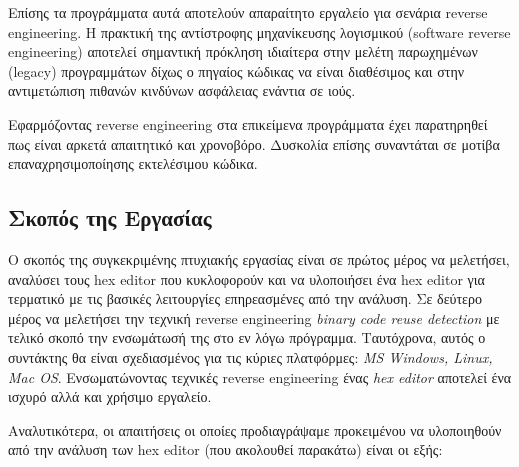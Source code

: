 Επίσης τα προγράμματα αυτά αποτελούν απαραίτητο εργαλείο για σενάρια reverse engineering. 
Η πρακτική της αντίστροφης μηχανίκευσης λογισμικού (software reverse engineering) αποτελεί σημαντική πρόκληση ιδιαίτερα στην μελέτη παρωχημένων (legacy) προγραμμάτων δίχως ο πηγαίος κώδικας να είναι διαθέσιμος και στην αντιμετώπιση πιθανών κινδύνων ασφάλειας ενάντια σε ιούς.

Εφαρμόζοντας reverse engineering στα επικείμενα προγράμματα έχει παρατηρηθεί πως είναι αρκετά απαιτητικό και χρονοβόρο. Δυσκολία επίσης συναντάται σε μοτίβα επαναχρησιμοποίησης εκτελέσιμου κώδικα.

\pagebreak
\subsection{Σκοπός της Εργασίας}
Ο σκοπός της συγκεκριμένης πτυχιακής εργασίας είναι σε πρώτος μέρος να μελετήσει, αναλύσει τους hex editor που κυκλοφορούν και να υλοποιήσει ένα hex editor για τερματικό με τις βασικές λειτουργίες επηρεασμένες από την ανάλυση.
Σε δεύτερο μέρος να μελετήσει την τεχνική reverse engineering \emph{binary code reuse detection} με τελικό σκοπό την ενσωμάτωσή της στο εν λόγω πρόγραμμα.
Ταυτόχρονα, αυτός ο συντάκτης θα είναι σχεδιασμένος για τις κύριες πλατφόρμες: \emph{MS Windows, Linux, Mac OS}.
Ενσωματώνοντας τεχνικές reverse engineering ένας \emph{hex editor} αποτελεί ένα ισχυρό αλλά και χρήσιμο εργαλείο.

Αναλυτικότερα, οι απαιτήσεις οι οποίες προδιαγράψαμε προκειμένου να υλοποιηθούν από την ανάλυση των hex editor (που ακολουθεί παρακάτω) είναι οι εξής:

